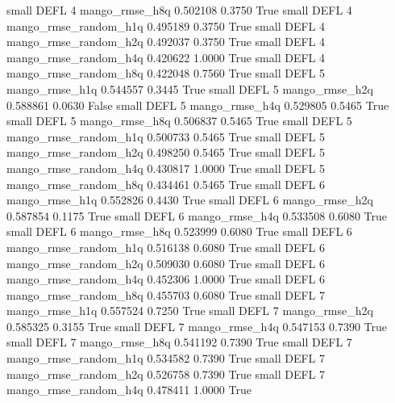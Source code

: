      small     DEFL                 4        mango_rmse_h8q      0.502108      0.3750    True
     small     DEFL                 4 mango_rmse_random_h1q      0.495189      0.3750    True
     small     DEFL                 4 mango_rmse_random_h2q      0.492037      0.3750    True
     small     DEFL                 4 mango_rmse_random_h4q      0.420622      1.0000    True
     small     DEFL                 4 mango_rmse_random_h8q      0.422048      0.7560    True
     small     DEFL                 5        mango_rmse_h1q      0.544557      0.3445    True
     small     DEFL                 5        mango_rmse_h2q      0.588861      0.0630   False
     small     DEFL                 5        mango_rmse_h4q      0.529805      0.5465    True
     small     DEFL                 5        mango_rmse_h8q      0.506837      0.5465    True
     small     DEFL                 5 mango_rmse_random_h1q      0.500733      0.5465    True
     small     DEFL                 5 mango_rmse_random_h2q      0.498250      0.5465    True
     small     DEFL                 5 mango_rmse_random_h4q      0.430817      1.0000    True
     small     DEFL                 5 mango_rmse_random_h8q      0.434461      0.5465    True
     small     DEFL                 6        mango_rmse_h1q      0.552826      0.4430    True
     small     DEFL                 6        mango_rmse_h2q      0.587854      0.1175    True
     small     DEFL                 6        mango_rmse_h4q      0.533508      0.6080    True
     small     DEFL                 6        mango_rmse_h8q      0.523999      0.6080    True
     small     DEFL                 6 mango_rmse_random_h1q      0.516138      0.6080    True
     small     DEFL                 6 mango_rmse_random_h2q      0.509030      0.6080    True
     small     DEFL                 6 mango_rmse_random_h4q      0.452306      1.0000    True
     small     DEFL                 6 mango_rmse_random_h8q      0.455703      0.6080    True
     small     DEFL                 7        mango_rmse_h1q      0.557524      0.7250    True
     small     DEFL                 7        mango_rmse_h2q      0.585325      0.3155    True
     small     DEFL                 7        mango_rmse_h4q      0.547153      0.7390    True
     small     DEFL                 7        mango_rmse_h8q      0.541192      0.7390    True
     small     DEFL                 7 mango_rmse_random_h1q      0.534582      0.7390    True
     small     DEFL                 7 mango_rmse_random_h2q      0.526758      0.7390    True
     small     DEFL                 7 mango_rmse_random_h4q      0.478411      1.0000    True
